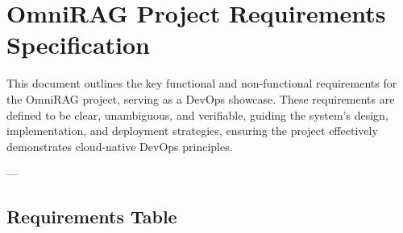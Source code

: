 \documentclass[a4paper,10pt]{article}
\begin{document}
\section*{OmniRAG Project Requirements Specification}
This document outlines the key functional and non-functional requirements for the OmniRAG project, serving as a DevOps showcase. These requirements are defined to be clear, unambiguous, and verifiable, guiding the system's design, implementation, and deployment strategies, ensuring the project effectively demonstrates cloud-native DevOps principles.

---

\subsection*{Requirements Table}
\end{document}
